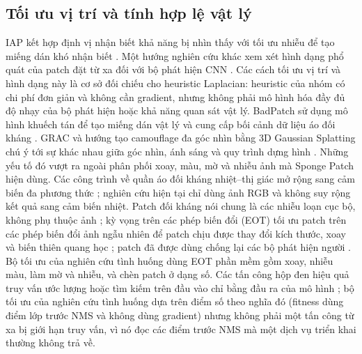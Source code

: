 \documentclass[a4paper,fleqn]{cas-dc}
\begin{document}
\subsection{Tối ưu vị trí và tính hợp lệ vật lý}
IAP kết hợp định vị nhận biết khả năng bị nhìn thấy với tối ưu nhiễu để tạo miếng dán khó nhận biết \cite{iap2025}. Một hướng nghiên cứu khác xem xét hình dạng phổ quát của patch đặt từ xa đối với bộ phát hiện CNN \cite{remotepatch2025}. Các cách tối ưu vị trí và hình dạng này là cơ sở đối chiếu cho heuristic Laplacian: heuristic của nhóm có chi phí đơn giản và không cần gradient, nhưng không phải mô hình hóa đầy đủ độ nhạy của bộ phát hiện hoặc khả năng quan sát vật lý. BadPatch sử dụng mô hình khuếch tán để tạo miếng dán vật lý và cung cấp bối cảnh dữ liệu áo đối kháng \cite{badpatch2025}. GRAC và hướng tạo camouflage đa góc nhìn bằng 3D Gaussian Splatting chú ý tới sự khác nhau giữa góc nhìn, ánh sáng và quy trình dựng hình \cite{grac2025,gs3dcamo2025}. Những yếu tố đó vượt ra ngoài phân phối xoay, màu, mờ và nhiễu ảnh mà Sponge Patch hiện dùng. Các công trình về quần áo đối kháng nhiệt--thị giác mở rộng sang cảm biến đa phương thức \cite{rgbt2026,thermal2026}; nghiên cứu hiện tại chỉ dùng ảnh RGB và không suy rộng kết quả sang cảm biến nhiệt. Patch đối kháng nói chung là các nhiễu loạn cục bộ, không phụ thuộc ảnh \cite{brown2017patch}; kỳ vọng trên các phép biến đổi (EOT) tối ưu patch trên các phép biến đổi ảnh ngẫu nhiên để patch chịu được thay đổi kích thước, xoay và biến thiên quang học \cite{athalye2018eot}; patch đã được dùng chống lại các bộ phát hiện người \cite{thys2019fooling}. Bộ tối ưu của nghiên cứu tình huống dùng EOT phần mềm gồm xoay, nhiễu màu, làm mờ và nhiễu, và chèn patch ở dạng số. Các tấn công hộp đen hiệu quả truy vấn ước lượng hoặc tìm kiếm trên đầu vào chỉ bằng đầu ra của mô hình \cite{ilyas2018blackbox}; bộ tối ưu của nghiên cứu tình huống dựa trên điểm số theo nghĩa đó (fitness dùng điểm lớp trước NMS và không dùng gradient) nhưng không phải một tấn công từ xa bị giới hạn truy vấn, vì nó đọc các điểm trước NMS mà một dịch vụ triển khai thường không trả về.
\end{document}
